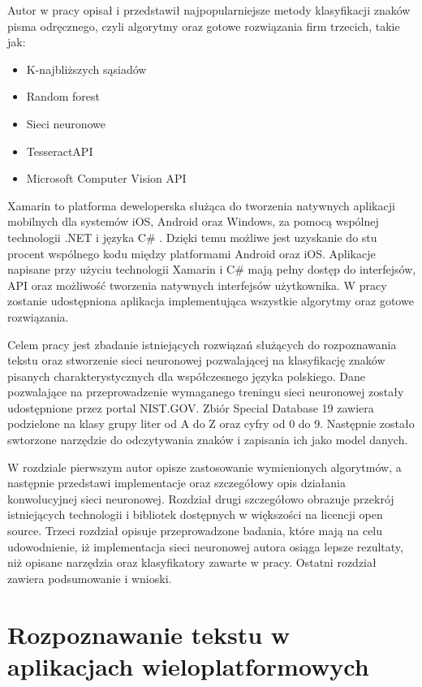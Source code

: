 \documentclass[brudnopis]{xmgr}
\begin{document}
	Autor w pracy opisał i przedstawił najpopularniejsze metody klasyfikacji znaków pisma odręcznego, czyli algorytmy oraz gotowe rozwiązania firm trzecich, takie jak:
\begin{itemize}
\item
K-najbliższych sąsiadów
\item
Random forest
\item
Sieci neuronowe
\item
TesseractAPI
\item
Microsoft Computer Vision API
\end{itemize}
\newpage

	Xamarin\cite{15} to platforma deweloperska służąca do tworzenia natywnych aplikacji mobilnych dla systemów iOS, Android oraz Windows, za pomocą wspólnej technologii .NET i języka C\#\cite{4} . Dzięki temu możliwe jest uzyskanie do stu procent wspólnego kodu między platformami Android oraz iOS. Aplikacje napisane przy użyciu technologii Xamarin\cite{15} i C\# mają pełny dostęp do interfejsów\cite{20}, API oraz możliwość tworzenia natywnych interfejsów użytkownika. W pracy zostanie udostępniona aplikacja implementująca wszystkie algorytmy oraz gotowe rozwiązania.
  
  Celem pracy jest  zbadanie istniejących rozwiązań służących do rozpoznawania tekstu oraz stworzenie sieci neuronowej pozwalającej na klasyfikację znaków pisanych charakterystycznych dla współczesnego języka polskiego. Dane pozwalające na przeprowadzenie wymaganego treningu sieci neuronowej zostały udostępnione przez portal NIST.GOV\cite{7}. Zbiór Special Database 19 zawiera podzielone na klasy grupy liter od A do Z oraz cyfry od 0 do 9. Następnie zostało swtorzone narzędzie do odczytywania znaków i zapisania ich jako model danych\cite{2}.
  
  W rozdziale pierwszym autor opisze zastosowanie wymienionych algorytmów, a następnie przedstawi implementacje oraz szczegółowy opis działania konwolucyjnej sieci neuronowej. Rozdział drugi szczegółowo obrazuje przekrój istniejących technologii i bibliotek dostępnych w większości na licencji open source. Trzeci rozdział opisuje przeprowadzone badania, które mają na celu udowodnienie, iż implementacja sieci neuronowej autora osiąga lepsze rezultaty, niż opisane narzędzia oraz klasyfikatory zawarte w pracy. Ostatni rozdział zawiera podsumowanie i wnioski.

\chapter{Rozpoznawanie tekstu w aplikacjach wieloplatformowych}
\end{document}
